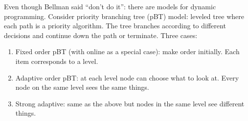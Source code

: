\documentclass[twoside]{article}
\begin{document}
Even though Bellman said ``don't do it'': there are models for dynamic programming. Consider priority branching tree (pBT) model: leveled tree where each path is a priority algorithm. The tree branches according to different decisions and continue down the path or terminate. Three cases:
\begin{enumerate}
\item Fixed order pBT (with online as a special case): make order initially. Each item corresponds to a level.
\item Adaptive order pBT: at each level node can choose what to look at. Every node on the same level sees the same things.
\item Strong adaptive: same as the above but nodes in the same level see different things. 
\end{enumerate}
\end{document}
